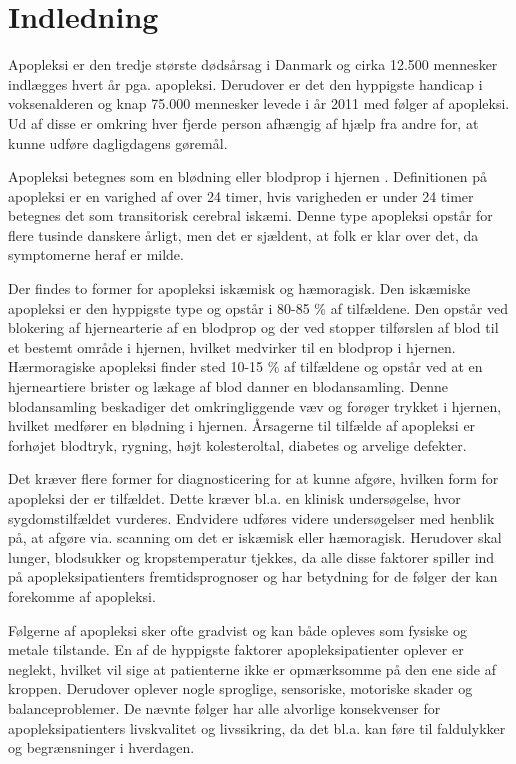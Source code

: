 \section{Indledning}
Apopleksi er den tredje største dødsårsag i Danmark og cirka 12.500 mennesker indlægges hvert år pga. apopleksi. Derudover er det den hyppigste handicap i voksenalderen og knap 75.000 mennesker levede i år 2011 med følger af apopleksi. Ud af disse er omkring hver fjerde person afhængig af hjælp fra andre for, at kunne udføre dagligdagens gøremål. \cite{Hjernesagen2015a}

Apopleksi betegnes som en blødning eller blodprop i hjernen \cite{Hjernesagen2015a}. Definitionen på apopleksi er en varighed af over 24 timer, hvis varigheden er under 24 timer betegnes det som transitorisk cerebral iskæmi. Denne type apopleksi opstår for flere tusinde danskere årligt, men det er sjældent, at folk er klar over det, da symptomerne heraf er milde.

Der findes to former for apopleksi iskæmisk og hæmoragisk.
Den iskæmiske apopleksi er den hyppigste type og opstår i 80-85 \% af tilfældene. Den opstår ved blokering af hjernearterie af en blodprop og der ved stopper tilførslen af blod til et bestemt område i hjernen, hvilket medvirker til en blodprop i hjernen.
Hærmoragiske apopleksi finder sted 10-15 \% af tilfældene og opstår ved at en hjerneartiere brister og lækage af blod danner en blodansamling. Denne blodansamling beskadiger det omkringliggende væv og forøger trykket i hjernen, hvilket medfører en blødning i hjernen. Årsagerne til tilfælde af apopleksi er forhøjet blodtryk, rygning, højt kolesteroltal, diabetes og arvelige defekter.

Det kræver flere former for diagnosticering for at kunne afgøre, hvilken form for apopleksi der er tilfældet. Dette kræver bl.a. en klinisk undersøgelse, hvor sygdomstilfældet vurderes. Endvidere udføres videre undersøgelser med henblik på, at afgøre via. scanning om det er iskæmisk eller hæmoragisk. Herudover skal lunger, blodsukker og kropstemperatur tjekkes, da alle disse faktorer spiller ind på apopleksipatienters fremtidsprognoser og har betydning for de følger der kan forekomme af apopleksi. 

Følgerne af apopleksi sker ofte gradvist og kan både opleves som fysiske og metale tilstande. En af de hyppigste faktorer apopleksipatienter oplever er neglekt, hvilket vil sige at patienterne ikke er opmærksomme på den ene side af kroppen. Derudover oplever nogle sproglige, sensoriske, motoriske skader og balanceproblemer. De nævnte følger har alle alvorlige konsekvenser for apopleksipatienters livskvalitet og livssikring, da det bl.a. kan føre til faldulykker og begrænsninger i hverdagen. 


